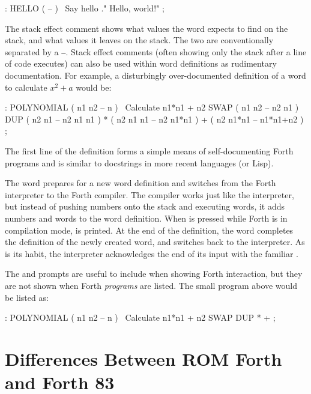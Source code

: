 \begin{forthcode}
: HELLO ( -- ) \ Say hello
  ." Hello, world!" ;
\end{forthcode}

\noindent The stack effect comment shows what values the word expects to find
on the stack, and what values it leaves on the stack. The two are
conventionally separated by a \texttt{--}. Stack effect comments (often showing
only the stack after a line of code executes) can also be used within word
definitions as rudimentary documentation. For example, a disturbingly
over-documented definition of a  word to calculate $x^2 + a$
would be:

\begin{forthcode}
: POLYNOMIAL ( n1 n2 -- n ) \ Calculate n1*n1 + n2
  SWAP ( n1 n2 -- n2 n1 )
  DUP  ( n2 n1 -- n2 n1 n1 )
  *    ( n2 n1 n1 -- n2 n1*n1 )
  +    ( n2 n1*n1 -- n1*n1+n2 )
;
\end{forthcode}

\noindent The first line of the definition forms a simple means of self-documenting Forth
programs and is similar to docstrings in more recent languages (or Lisp).

The \fw{:} word prepares for a new word definition and switches from the Forth
interpreter to the Forth compiler. The compiler works just like the
interpreter, but instead of pushing numbers onto the stack and executing words,
it adds numbers and words to the word definition. When  is
pressed while Forth is in compilation mode,  is printed. At
the end of the definition, the \fw{;} word completes the definition of the
newly created word, and switches back to the interpreter. As is its habit, the
interpreter acknowledges the end of its input with the familiar .

The  and  prompts are useful to include when
showing Forth interaction, but they are not shown when Forth {\em programs\/}
are listed. The small program above would be listed as:

\begin{forthcode}
: POLYNOMIAL ( n1 n2 -- n ) \ Calculate n1*n1 + n2
  SWAP DUP * + ;
\end{forthcode}

\section{Differences Between ROM Forth and Forth 83}

